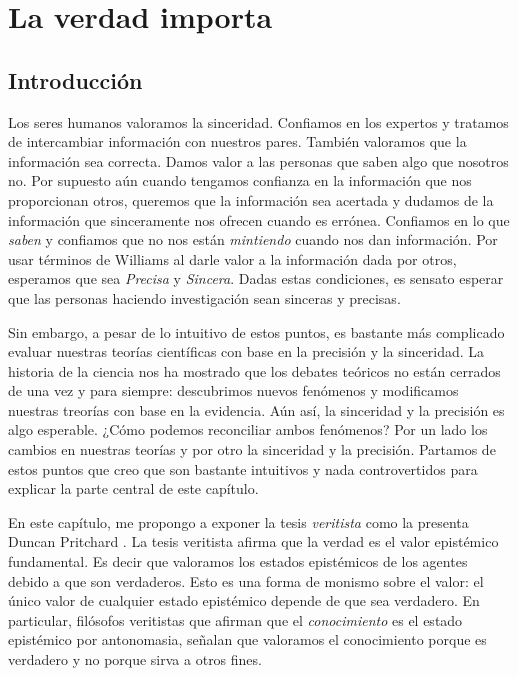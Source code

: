 



   
\chapter{La verdad importa}
\label{ch:truthmatter}

\section{Introducción}
 
Los seres humanos valoramos la sinceridad.
Confiamos en los expertos y tratamos de intercambiar información con nuestros pares.
También valoramos que la información sea correcta.
Damos valor a las personas que saben algo que nosotros no.
Por supuesto aún cuando tengamos confianza en la información que nos proporcionan otros, queremos que la información sea acertada y dudamos de la información que sinceramente nos ofrecen cuando es errónea.
Confiamos en lo que \emph{saben} y confiamos que no nos están \emph{mintiendo} cuando nos dan información.
Por usar términos de Williams \parencite{williams2002} al darle valor a la información dada por otros, esperamos que sea \emph{Precisa} y \emph{Sincera}.
Dadas estas condiciones, es sensato esperar que las personas haciendo investigación sean sinceras y precisas.

Sin embargo, a pesar de lo intuitivo de estos puntos, es bastante más complicado evaluar nuestras teorías científicas con base en la precisión y la sinceridad.
La historia de la ciencia nos ha mostrado que los debates teóricos no están cerrados de una vez y para siempre: descubrimos nuevos fenómenos y modificamos nuestras treorías con base en la evidencia.
Aún así, la sinceridad y la precisión es algo esperable.
¿Cómo podemos reconciliar ambos fenómenos?
Por un lado los cambios en nuestras teorías y por otro la sinceridad y la precisión.
Partamos de estos puntos que creo que son bastante intuitivos y nada controvertidos para explicar la parte central de este capítulo.

En este capítulo, me propongo a exponer la tesis \textit{veritista} como la presenta Duncan Pritchard \parencite{pritchardEpistemicValueCognitive2021}.
La tesis veritista afirma que la verdad es el valor epistémico fundamental.
Es decir que valoramos los estados epistémicos de los agentes debido a que son verdaderos.
Esto es una forma de monismo sobre el valor: el único valor de cualquier estado epistémico depende de que sea verdadero.
En particular, filósofos veritistas que afirman que el \emph{conocimiento} es el estado epistémico por antonomasia, señalan que valoramos el conocimiento porque es verdadero y no porque sirva a otros fines.


